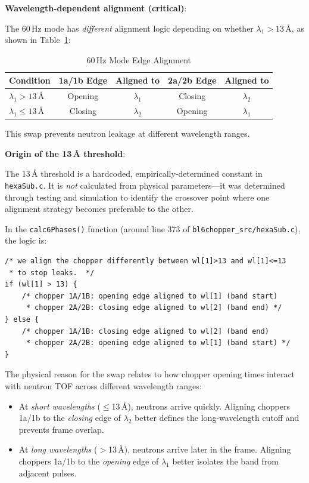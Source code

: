 \documentclass[11pt,letterpaper]{article}
\begin{document}
\textbf{Wavelength-dependent alignment (critical)}:

The 60\,Hz mode has \emph{different} alignment logic depending on whether $\lambda_1 > 13$\,\AA{}, as shown in Table~\ref{tab:60hz_alignment}:

\begin{table}[h]
\centering
\caption{60\,Hz Mode Edge Alignment}
\label{tab:60hz_alignment}
\begin{tabular}{lcccc}
\toprule
Condition & 1a/1b Edge & Aligned to & 2a/2b Edge & Aligned to \\
\midrule
$\lambda_1 > 13$\,\AA{} & Opening & $\lambda_1$ & Closing & $\lambda_2$ \\
$\lambda_1 \leq 13$\,\AA{} & Closing & $\lambda_2$ & Opening & $\lambda_1$ \\
\bottomrule
\end{tabular}
\end{table}

This swap prevents neutron leakage at different wavelength ranges.

\textbf{Origin of the 13\,\AA{} threshold}:

The 13\,\AA{} threshold is a hardcoded, empirically-determined constant in \texttt{hexaSub.c}. It is \emph{not} calculated from physical parameters---it was determined through testing and simulation to identify the crossover point where one alignment strategy becomes preferable to the other.

In the \texttt{calc6Phases()} function (around line 373 of \texttt{bl6chopper\_src/hexaSub.c}), the logic is:

\begin{verbatim}
/* we align the chopper differently between wl[1]>13 and wl[1]<=13
 * to stop leaks.  */
if (wl[1] > 13) {
    /* chopper 1A/1B: opening edge aligned to wl[1] (band start)
     * chopper 2A/2B: closing edge aligned to wl[2] (band end) */
} else {
    /* chopper 1A/1B: closing edge aligned to wl[2] (band end)
     * chopper 2A/2B: opening edge aligned to wl[1] (band start) */
}
\end{verbatim}

The physical reason for the swap relates to how chopper opening times interact with neutron TOF across different wavelength ranges:
\begin{itemize}
    \item At \emph{short wavelengths} ($\leq$13\,\AA{}), neutrons arrive quickly. Aligning choppers 1a/1b to the \emph{closing} edge of $\lambda_2$ better defines the long-wavelength cutoff and prevents frame overlap.
    \item At \emph{long wavelengths} ($>$13\,\AA{}), neutrons arrive later in the frame. Aligning choppers 1a/1b to the \emph{opening} edge of $\lambda_1$ better isolates the band from adjacent pulses.
\end{itemize}
\end{document}
